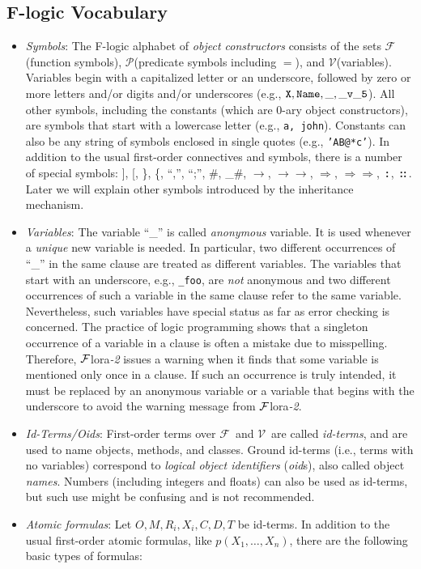 \documentclass[11pt]{article}
\newcommand{\isa}{\,{\bf{:}}\,}
\newcommand{\subcl}{\,{\bf{::}}\,}
\newcommand{\fd}{\ensuremath{{\rightarrow}}}                   %
\newcommand{\mvd}{\ensuremath{{\rightarrow\!\!\!\!\rightarrow}}}  %
\newcommand{\Fd}{\ensuremath{{\Rightarrow}}}                      %
\newcommand{\Mvd}{\ensuremath{{\Rightarrow\!\!\!\!\Rightarrow}}}  %
\newcommand{\FLORA}{{\mbox{${\cal F}${\sc lora}\rm\emph{-2}}}\xspace}
\newcommand{\fl}{\mbox{F-logic}\xspace}
\newcommand{\funcs}{\ensuremath{\mathcal{F}}}
\newcommand{\preds}{\ensuremath{\mathcal{P}}}
\newcommand{\vars}{\ensuremath{\mathcal{V}}}
\begin{document}
\subsection{\fl Vocabulary}\label{sec-basic-flogic}


\begin{itemize}
\item \emph{Symbols}: The \fl alphabet of \emph{object constructors}
  consists of the sets \funcs (function symbols), \preds (predicate symbols
  including $=$), and \vars (variables).  Variables begin with a
  capitalized letter or an underscore, followed by zero or more letters
  and/or digits and/or underscores (e.g., $\tt X, Name, \_, \_v\_5$).
  All other symbols, including the constants (which are 0-ary object
  constructors), are symbols that start with a lowercase letter (e.g., {\tt a,
  john}). Constants can also be any string of symbols enclosed in single
  quotes (e.g., {\tt 'AB@*c'}). 
  In addition to the usual first-order connectives and symbols, there is a
  number of special symbols:
  ], [, \}, \{, ``,'', ``;'', \#, \_\#, \fd, \mvd, \Fd,
  \Mvd, \isa, \subcl. Later we will explain other symbols introduced by
  the inheritance mechanism.
  
\item \emph{Variables}: The variable ``\_'' is called \emph{anonymous}
  variable. It is used whenever a \emph{unique} new variable is needed.
  In particular, two different occurrences of ``\_'' in the same clause are
  treated as different variables. The variables that start with an
  underscore, e.g., {\tt \_foo}, are \emph{not} anonymous and two
  different occurrences of such a variable in the same clause refer to the
  same variable. Nevertheless, such variables have special status as far as
  error checking is concerned. The practice of logic programming shows that
  a singleton occurrence of a variable in a clause is often a mistake
  due to misspelling. Therefore, \FLORA issues a warning when
  it finds that some variable is mentioned only once in a clause. If such
  an occurrence is truly intended, it must be replaced by an anonymous
  variable or a variable that begins with the underscore to avoid the
  warning message from \FLORA.

\item \emph{Id-Terms/Oids}:
    First-order terms over \funcs\ and \vars\ are called \emph{id-terms},
    and are used to name objects, methods, and classes.  Ground id-terms
    (i.e., terms with no variables) correspond to \emph{logical
      object identifiers} (\emph{oid}s), also called object \emph{names}.
    Numbers (including integers and floats) can also be used as id-terms,
    but such use might be confusing and is not recommended.
  \index{atomic formula!in \fl}
\item \emph{Atomic formulas}: Let $O,M,R_{i},X_{i},C,D,T$ be id-terms.  In
  addition to the usual first-order atomic formulas, like
  $p(X_1,\dots,X_n)$, there are the following basic types of formulas:
  \medskip


\end{itemize}
\end{document}
